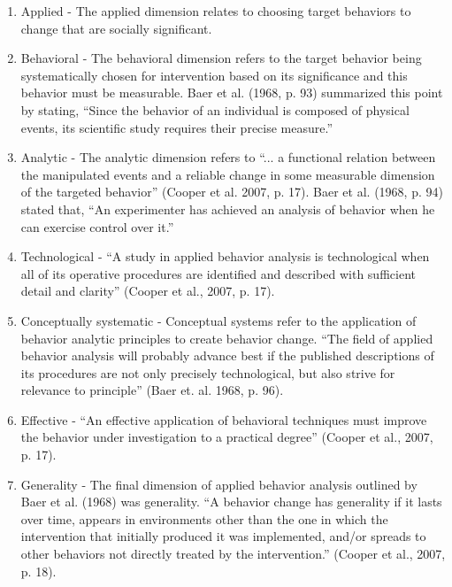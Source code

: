 \begin{enumerate}
\item Applied - The applied dimension relates to choosing target behaviors to change that are socially significant. 
\item Behavioral - The behavioral dimension refers to the target behavior being systematically chosen for intervention based on its significance and this behavior must be measurable.  Baer et al. (1968, p. 93) summarized this point by stating, ``Since the behavior of an individual is composed of physical events, its scientific study requires their precise measure.''
\item Analytic - The analytic dimension refers to ``... a functional relation between the manipulated events and a reliable change in some measurable dimension of the targeted behavior'' (Cooper et al. 2007, p. 17). Baer et al. (1968, p. 94) stated that, ``An experimenter has achieved an analysis of behavior when he can exercise control over it.''
\item Technological - ``A study in applied behavior analysis is technological when all of its operative procedures are identified and described with sufficient detail and clarity'' (Cooper et al., 2007, p. 17).
\item Conceptually systematic - Conceptual systems refer to the application of behavior analytic principles to create behavior change. ``The field of applied behavior analysis will probably advance best if the published descriptions of its procedures are not only precisely technological, but also strive for relevance to principle'' (Baer et. al. 1968, p. 96).
\item Effective - ``An effective application of behavioral techniques must improve the behavior under investigation to a practical degree'' (Cooper et al., 2007, p. 17).
\item Generality - The final dimension of applied behavior analysis outlined by Baer et al. (1968) was generality. ``A behavior change has generality if it lasts over time, appears in environments other than the one in which the intervention that initially produced it was implemented, and/or spreads to other behaviors not directly treated by the intervention.'' (Cooper et al., 2007, p. 18).
\end{enumerate}

